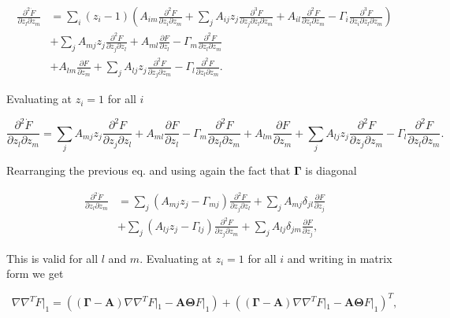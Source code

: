 \begin{equation*}
  \begin{split}
    \frac{\partial^2 \dot{F}}{\partial z_l \partial z_m} &= \sum_i(z_i-1) \left(A_{im}\frac{\partial^2F}{\partial z_i \partial z_m} + \sum_jA_{ij}z_j\frac{\partial^3F}{\partial z_j \partial z_l \partial z_m}+A_{il}\frac{\partial^2F}{\partial z_l\partial z_m} - \Gamma_i\frac{\partial^3F}{\partial z_i \partial z_l \partial z_m}   \right)\\
    &+\sum_jA_{mj}z_j\frac{\partial^2F}{\partial z_j\partial z_l}+A_{ml}\frac{\partial F}{\partial z_l} - \Gamma_m\frac{\partial^2F}{\partial z_l\partial z_m}\\
    &+ A_{lm}\frac{\partial F}{\partial z_m} + \sum_jA_{lj}z_j\frac{\partial^2F}{\partial z_j\partial z_m}-\Gamma_l\frac{\partial^2F}{\partial z_l\partial z_m}.
  \end{split}
\end{equation*}

Evaluating at $z_i=1$ for all $i$

\begin{equation*}
  \frac{\partial^2\dot{F}}{\partial z_l \partial z_m} = \sum_jA_{mj}z_j\frac{\partial^2F}{\partial z_j\partial z_l}+A_{ml}\frac{\partial F}{\partial z_l} - \Gamma_m\frac{\partial^2F}{\partial z_l\partial z_m} + A_{lm}\frac{\partial F}{\partial z_m} + \sum_jA_{lj}z_j\frac{\partial^2F}{\partial z_j\partial z_m}-\Gamma_l\frac{\partial^2F}{\partial z_l\partial z_m}.
\end{equation*}

Rearranging the previous eq. and using again the fact that $\mathbf{\Gamma}$ is diagonal

\begin{equation*}
  \begin{split}
    \frac{\partial^2\dot{F}}{\partial z_l \partial z_m} &= \sum_j\left(A_{mj}z_j-\Gamma_{mj}\right)\frac{\partial^2F}{\partial z_j\partial z_l} + \sum_jA_{mj}\delta_{jl}\frac{\partial F}{\partial z_j}\\
    &+\sum_j\left(A_{lj}z_j-\Gamma_{lj}\right)\frac{\partial^2F}{\partial z_j\partial z_m} + \sum_jA_{lj}\delta_{jm}\frac{\partial F}{\partial z_j},
  \end{split}
\end{equation*}

This is valid for all $l$ and $m$. Evaluating at $z_i=1$ for all $i$ and writing in matrix form we get

\begin{equation}
  \label{eq:mas-general}
  \nabla\nabla^T\dot{F}|_1 = \left(\left(\mathbf{\Gamma} - \mathbf{A}\right)\nabla\nabla^TF|_1 - \mathbf{A}\mathbf{\Theta} F|_1\right)+\left(\left(\mathbf{\Gamma} - \mathbf{A}\right)\nabla\nabla^TF|_1 - \mathbf{A}\mathbf{\Theta} F|_1\right)^T,
\end{equation}

